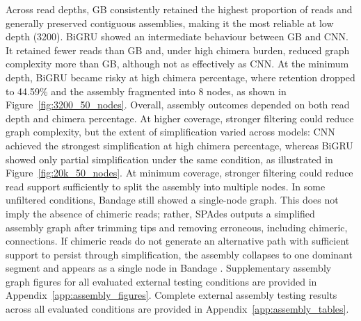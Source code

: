 Across read depths, GB consistently retained the highest proportion of reads and generally preserved contiguous assemblies, making it the most reliable at low depth (3200). BiGRU showed an intermediate behaviour between GB and CNN. It retained fewer reads than GB and, under high chimera burden, reduced graph complexity more than GB, although not as effectively as CNN. At the minimum depth, BiGRU became risky at high chimera percentage, where retention dropped to 44.59\% and the assembly fragmented into 8 nodes, as shown in Figure~\ref{fig:3200_50_nodes}. Overall, assembly outcomes depended on both read depth and chimera percentage. At higher coverage, stronger filtering could reduce graph complexity, but the extent of simplification varied across models: CNN achieved the strongest simplification at high chimera percentage, whereas BiGRU showed only partial simplification under the same condition, as illustrated in Figure~\ref{fig:20k_50_nodes}. At minimum coverage, stronger filtering could reduce read support sufficiently to split the assembly into multiple nodes. In some unfiltered conditions, Bandage still showed a single-node graph. This does not imply the absence of chimeric reads; rather, SPAdes outputs a simplified assembly graph after trimming tips and removing erroneous, including chimeric, connections. If chimeric reads do not generate an alternative path with sufficient support to persist through simplification, the assembly collapses to one dominant segment and appears as a single node in Bandage \cite{Bankevich2012SPAdes,Antipov2016SPAdesHybrid,Wick2015Bandage}. Supplementary assembly graph figures for all evaluated external testing conditions are provided in Appendix~\ref{app:assembly_figures}. Complete external assembly testing results across all evaluated conditions are provided in Appendix~\ref{app:assembly_tables}.

